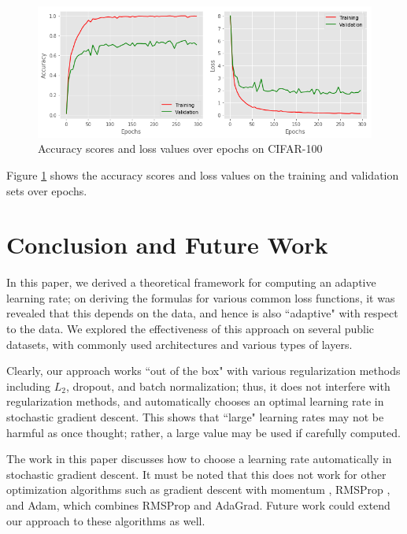 \documentclass{article}
\begin{document}
\begin{figure}
    \centering
    \includegraphics[scale=0.4]{plot-rn162.png}
    \caption{Accuracy scores and loss values over epochs on CIFAR-100}
    \label{fig:cifar100:2}
\end{figure}

Figure \ref{fig:cifar100:2} shows the accuracy scores and loss values on the training and validation sets over epochs.

\section{Conclusion and Future Work}
In this paper, we derived a theoretical framework for computing an adaptive learning rate; on deriving the formulas for various common loss functions, it was revealed that this depends on the data, and hence is also ``adaptive" with respect to the data. We explored the effectiveness of this approach on several public datasets, with commonly used architectures and various types of layers.

Clearly, our approach works ``out of the box" with various regularization methods including $L_2$, dropout, and batch normalization; thus, it does not interfere with regularization methods, and automatically chooses an optimal learning rate in stochastic gradient descent. This shows that ``large" learning rates may not be harmful as once thought; rather, a large value may be used if carefully computed.

The work in this paper discusses how to choose a learning rate automatically in stochastic gradient descent. It must be noted that this does not work for other optimization algorithms such as gradient descent with momentum \cite{sutskever2013importance}, RMSProp \cite{tieleman2012lecture}, and Adam\cite{kingma2014adam}, which combines RMSProp and AdaGrad\cite{duchi2011adaptive}. Future work could extend our approach to these algorithms as well.



\end{document}
